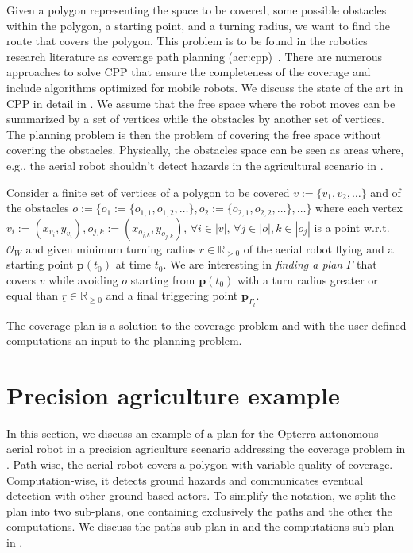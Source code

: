 Given a polygon representing the space to be covered, some possible obstacles within the polygon, a starting point, and a turning radius, we want to find the route that covers the polygon. This problem is to be found in the robotics research literature as coverage path planning (\Gls{acr:cpp})~\citep{choset1998coverage,choset2001coverage,galceran2013survey}. There are numerous approaches to solve CPP that ensure the completeness of the coverage and include algorithms optimized for mobile robots. We discuss the state of the art in CPP in detail in . We assume that the free space where the robot moves can be summarized by a set of vertices while the obstacles by another set of vertices. The planning problem is then the problem of covering the free space without covering the obstacles. Physically, the obstacles space can be seen as areas where, e.g., the aerial robot shouldn't detect hazards in the agricultural scenario in .

\begin{pb}
  \label{pb:cov-pb}
  Consider a finite set of vertices of a polygon to be covered $v:=\{v_1,v_2,\dots\}$ and of the obstacles $o:=\{o_1:=\{o_{1,1},o_{1,2},\dots\},o_2:=\{o_{2,1},o_{2,2},\dots\},\dots\}$ where each vertex $v_i:=(x_{v_i},y_{v_i}),o_{j,k}:=(x_{o_{j,k}},y_{o_{j,k}}),\,\forall i\in|v|,\,\forall j\in|o|,k\in|o_j|$ is a point w.r.t. $\mathcal{O}_W$ and given minimum turning radius $r\in\mathbb{R}_{>0}$ of the aerial robot flying and a starting point $\mathbf{p}(t_0)$ at time $t_0$.
  We are interesting in \textit{finding a plan} $\Gamma$ that covers $v$ while avoiding $o$ starting from $\mathbf{p}(t_0)$ with a turn radius greater or equal than $\underline{r}\in\mathbb{R}_{\geq 0}$ and a final triggering point $\mathbf{p}_{\Gamma_l}$.
\end{pb}    

The coverage plan is a solution to the coverage problem and with the user-defined computations an input to the planning problem.


\section{Precision agriculture example}
\label{sec:flight-plan}

In this section, we discuss an example of a plan for the Opterra autonomous aerial robot in a precision agriculture scenario addressing the coverage problem in . Path-wise, the aerial robot covers a polygon with variable quality of coverage. Computation-wise, it detects ground hazards and communicates eventual detection with other ground-based actors. To simplify the notation, we split the plan into two sub-plans, one containing exclusively the paths and the other the computations. We discuss the paths sub-plan in  and the computations sub-plan in .

